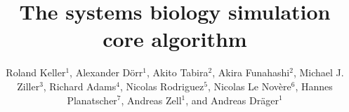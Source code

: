 \documentclass[10pt]{bmc_article}
\newenvironment{bmcformat}{\fussy\setboolean{publ}{true}}{\fussy}
\begin{document}
\begin{bmcformat}



\title{The systems biology simulation core algorithm}



\author{%
Roland Keller$^{1}$, %
Alexander D\"orr$^{1}$, %
Akito Tabira$^{2}$, %
Akira Funahashi$^{2}$, %
Michael J. Ziller$^{3}$, %
Richard Adams$^{4}$, %
Nicolas Rodriguez$^{5}$, %
Nicolas Le Nov\`{e}re$^{6}$, %
Hannes Planatscher$^{7}$, %
Andreas Zell$^{1}$, %
and Andreas Dr\"ager$^{1}$\correspondingauthor{}%
}


\address{%
\iid(1)Center for Bioinformatics Tuebingen (ZBIT), University of
Tuebingen, T\"ubingen, Germany
\iid(2)Keio University, Graduate School of
Science and Technology, Yokohama, Japan 
\iid(3)Department of Stem Cell and Regenerative Biology, Harvard University,
Cambridge, MA, USA
\iid(4)SynthSys Edinburgh, CH Waddington Building, University of Edinburgh,
Edinburgh EH9 3JD, UK
\iid(5)European Bioinformatics Institute, Wellcome Trust Genome Campus, Hinxton,
Cambridge, UK
\iid(6)Babraham Institute, Babraham, Cambridge, UK
\iid(7)Natural and Medical Sciences Institute at the University of Tuebingen,
Reutlingen, Germany}


\end{bmcformat}
\end{document}
